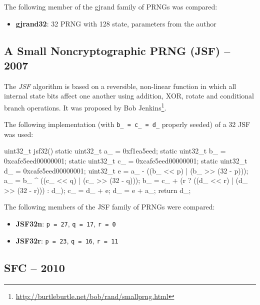     The following member of the gjrand family of PRNGs was compared:
    \begin{itemize}
        \itemsep0em
        \item \textbf{gjrand32}: \SI{32}{\bit} PRNG with \SI{128}{\bit} state, parameters from the author
    \end{itemize}

\subsection[A Small Noncryptographic PRNG (JSF) -- 2007]{A Small Noncryptographic PRNG (JSF) -- 2007} \label{subsec:jsf}

    The \emph{JSF} algorithm is based on a reversible, non-linear function in which all internal state bits affect one another using addition, XOR, rotate and conditional branch operations. It was proposed by Bob Jenkins\footnote{\url{http://burtleburtle.net/bob/rand/smallprng.html}}.

    The following implementation (with \lstinline|b_ = c_ = d_| properly seeded) of a \SI{32}{\bit} JSF was used:
\begin{@empty}
    \lstset{
        language = [ISO]C++
    }
\begin{centeredshadowboxlisting}
uint32_t jsf32() {
    static uint32_t a_ = 0xf1ea5eed;
    static uint32_t b_ = 0xcafe5eed00000001;
    static uint32_t c_ = 0xcafe5eed00000001;
    static uint32_t d_ = 0xcafe5eed00000001;
    uint32_t e = a_ - ((b_ << p)
                     | (b_ >> (32 - p)));
    a_ = b_ ^ ((c_ << q) | (c_ >> (32 - q)));
    b_ = c_ + (r ? ((d_ << r)
                  | (d_ >> (32 - r))) : d_);
    c_ = d_ + e;
    d_ = e + a_;
    return d_;
}
\end{centeredshadowboxlisting}
\end{@empty}

    The following members of the JSF family of PRNGs were compared:
    \begin{itemize}
        \itemsep0em
        \item \textbf{JSF32n}: \lstinline|p = 27|, \lstinline|q = 17|, \lstinline|r = 0|
        \item \textbf{JSF32r}: \lstinline|p = 23|, \lstinline|q = 16|, \lstinline|r = 11|
    \end{itemize}

\subsection[SFC -- 2010]{SFC -- 2010} \label{subsec:sfc}

